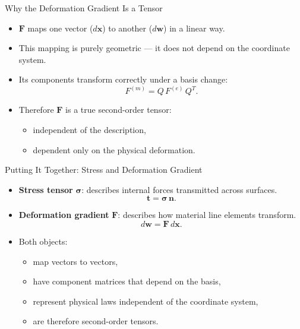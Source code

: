 \documentclass{beamer}
\begin{document}
\begin{frame}{Why the Deformation Gradient Is a Tensor}

\begin{itemize}

\item $\mathbf{F}$ maps one vector ($d\mathbf{x}$) to another ($d\mathbf{w}$) in a linear way.
\item This mapping is purely geometric — it does not depend on the coordinate system.
\item Its components transform correctly under a basis change:
\[
F^{(m)} = Q\,F^{(e)}\,Q^T.
\]

\item Therefore $\mathbf{F}$ is a true second-order tensor:
\begin{itemize}
  \item independent of the description,
  \item dependent only on the physical deformation.
\end{itemize}

\end{itemize}

\end{frame}

\begin{frame}{Putting It Together: Stress and Deformation Gradient}

\begin{itemize}

\item \textbf{Stress tensor} $\boldsymbol{\sigma}$: describes internal forces transmitted across surfaces.
\[
\mathbf{t} = \boldsymbol{\sigma}\,\mathbf{n}.
\]

\item \textbf{Deformation gradient} $\mathbf{F}$: describes how material line elements transform.
\[
d\mathbf{w} = \mathbf{F}\,d\mathbf{x}.
\]

\item Both objects:
\begin{itemize}
  \item map vectors to vectors,
  \item have component matrices that depend on the basis,
  \item represent physical laws independent of the coordinate system,
  \item are therefore second-order tensors.
\end{itemize}

\end{itemize}

\end{frame}
\end{document}
